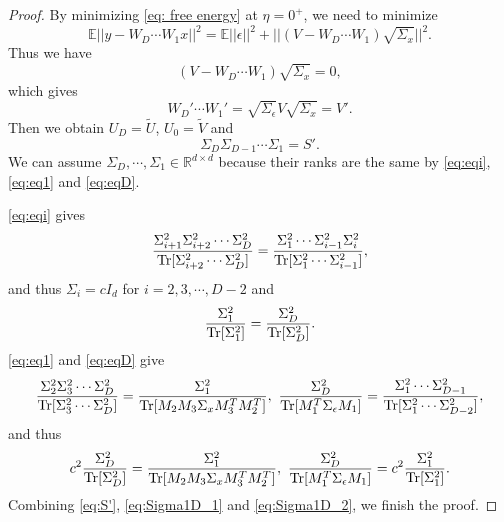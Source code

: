 \documentclass{article}
\theoremstyle{plain}
\newcommand{\Tr}{{\rm Tr}}
\begin{document}
\begin{proof}
By minimizing \eqref{eq: free energy} at $\eta=0^+$, we need to minimize
\begin{equation}
\mathbb{E}||y-W_D\cdots W_1x||^2=\mathbb{E}||\epsilon||^2+||(V-W_D\cdots W_1)\sqrt{\Sigma_x}||^2.
\end{equation}
Thus we have
\begin{equation}
(V-W_D\cdots W_1)\sqrt{\Sigma_x}=0,
\end{equation}
which gives
\begin{equation}
W_D'\cdots W_1'=\sqrt{\Sigma_\epsilon}V\sqrt{\Sigma_x}=V'.
\end{equation}
Then we obtain $U_D=\tilde{U}$, $U_0=\tilde{V}$ and
\begin{equation}
\Sigma_D\Sigma_{D-1}\cdots\Sigma_1=S'.
\label{eq:S'}
\end{equation}
We can assume $\Sigma_D,\cdots,\Sigma_1\in\mathbb{R}^{d\times d}$ because their ranks are the same by \eqref{eq:eqi}, \eqref{eq:eq1} and \eqref{eq:eqD}.

\eqref{eq:eqi} gives
\begin{equation}
\frac{\Sigma_{i+1}^2\Sigma_{i+2}^2\cdots\Sigma_D^2}{\Tr [\Sigma_{i+2}^2\cdots\Sigma_D^2]}=\frac{\Sigma_1^2\cdots\Sigma_{i-1}^2\Sigma_i^2}{\Tr[\Sigma_1^2\cdots\Sigma_{i-1}^2]},
\end{equation}
and thus $\Sigma_i=cI_d$ for $i=2,3,\cdots,D-2$ and
\begin{equation}
\frac{\Sigma_1^2}{\Tr[\Sigma_1^2]}=\frac{\Sigma_D^2}{\Tr[\Sigma_D^2]}.
\label{eq:Sigma1D_1}
\end{equation}
\eqref{eq:eq1} and \eqref{eq:eqD} give
\begin{equation}
\frac{\Sigma_{2}^2\Sigma_{3}^2\cdots\Sigma_D^2}{\Tr [\Sigma_{3}^2\cdots\Sigma_D^2]}=\frac{\Sigma_1^2}{\Tr[M_2M_3\Sigma_xM_3^TM_2^T]},\ \frac{\Sigma_D^2}{\Tr[M_1^T\Sigma_\epsilon M_1]}=\frac{\Sigma_1^2\cdots\Sigma_{D-1}^2}{\Tr[\Sigma_1^2\cdots\Sigma_{D-2}^2]},
\end{equation}
and thus
\begin{equation}
c^2\frac{\Sigma_D^2}{\Tr[\Sigma_D^2]}=\frac{\Sigma_1^2}{\Tr[M_2M_3\Sigma_xM_3^TM_2^T]},\ \frac{\Sigma_D^2}{\Tr[M_1^T\Sigma_\epsilon M_1]}=c^2\frac{\Sigma_1^2}{\Tr[\Sigma_1^2]}.
\label{eq:Sigma1D_2}
\end{equation}
Combining \eqref{eq:S'}, \eqref{eq:Sigma1D_1} and \eqref{eq:Sigma1D_2}, we finish the proof.

\end{proof}
\end{document}
